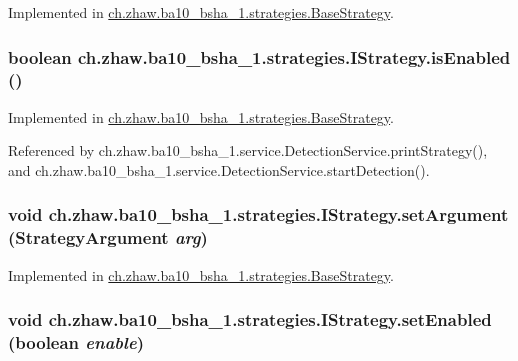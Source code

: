 Implemented in \hyperlink{classch_1_1zhaw_1_1ba10__bsha__1_1_1strategies_1_1BaseStrategy_a468d38d65e49d18ced35a34962e3f667}{ch.zhaw.ba10\_\-bsha\_\-1.strategies.BaseStrategy}.\hypertarget{interfacech_1_1zhaw_1_1ba10__bsha__1_1_1strategies_1_1IStrategy_a64149a1aad4d39dde043d11b2e7cc673}{
\subsubsection[{isEnabled}]{\setlength{\rightskip}{0pt plus 5cm}boolean ch.zhaw.ba10\_\-bsha\_\-1.strategies.IStrategy.isEnabled ()}}
\label{interfacech_1_1zhaw_1_1ba10__bsha__1_1_1strategies_1_1IStrategy_a64149a1aad4d39dde043d11b2e7cc673}


Implemented in \hyperlink{classch_1_1zhaw_1_1ba10__bsha__1_1_1strategies_1_1BaseStrategy_ad8e0e57f59a0ca49b27f205a39f2b8ae}{ch.zhaw.ba10\_\-bsha\_\-1.strategies.BaseStrategy}.

Referenced by ch.zhaw.ba10\_\-bsha\_\-1.service.DetectionService.printStrategy(), and ch.zhaw.ba10\_\-bsha\_\-1.service.DetectionService.startDetection().\hypertarget{interfacech_1_1zhaw_1_1ba10__bsha__1_1_1strategies_1_1IStrategy_aa5cbdd49578bcc84207fc073bc91da99}{
\subsubsection[{setArgument}]{\setlength{\rightskip}{0pt plus 5cm}void ch.zhaw.ba10\_\-bsha\_\-1.strategies.IStrategy.setArgument ({\bf StrategyArgument} {\em arg})}}
\label{interfacech_1_1zhaw_1_1ba10__bsha__1_1_1strategies_1_1IStrategy_aa5cbdd49578bcc84207fc073bc91da99}


Implemented in \hyperlink{classch_1_1zhaw_1_1ba10__bsha__1_1_1strategies_1_1BaseStrategy_ad1b20c8f3f41126c9e6cef52d3f30bbe}{ch.zhaw.ba10\_\-bsha\_\-1.strategies.BaseStrategy}.\hypertarget{interfacech_1_1zhaw_1_1ba10__bsha__1_1_1strategies_1_1IStrategy_ae95d5ca1a67248a3c6dd80b40d6f6a32}{
\subsubsection[{setEnabled}]{\setlength{\rightskip}{0pt plus 5cm}void ch.zhaw.ba10\_\-bsha\_\-1.strategies.IStrategy.setEnabled (boolean {\em enable})}}
\label{interfacech_1_1zhaw_1_1ba10__bsha__1_1_1strategies_1_1IStrategy_ae95d5ca1a67248a3c6dd80b40d6f6a32}


